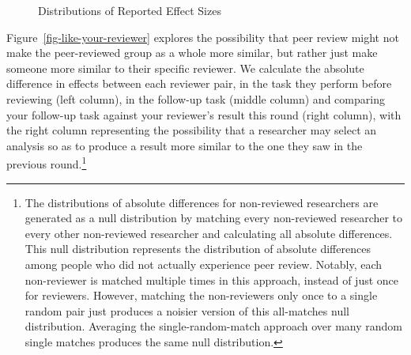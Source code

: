 \documentclass[
  letterpaper,
  DIV=11,
  numbers=noendperiod]{scrartcl}
\begin{document}
\begin{figure}


\caption{\label{fig-peer-review-effect-distributions}Distributions of
Reported Effect Sizes}

\end{figure}%

Figure~\ref{fig-like-your-reviewer} explores the possibility that peer
review might not make the peer-reviewed group as a whole more similar,
but rather just make someone more similar to their specific reviewer. We
calculate the absolute difference in effects between each reviewer pair,
in the task they perform before reviewing (left column), in the
follow-up task (middle column) and comparing your follow-up task against
your reviewer's result this round (right column), with the right column
representing the possibility that a researcher may select an analysis so
as to produce a result more similar to the one they saw in the previous
round.\footnote{The distributions of absolute differences for
  non-reviewed researchers are generated as a null distribution by
  matching every non-reviewed researcher to every other non-reviewed
  researcher and calculating all absolute differences. This null
  distribution represents the distribution of absolute differences among
  people who did not actually experience peer review. Notably, each
  non-reviewer is matched multiple times in this approach, instead of
  just once for reviewers. However, matching the non-reviewers only once
  to a single random pair just produces a noisier version of this
  all-matches null distribution. Averaging the single-random-match
  approach over many random single matches produces the same null
  distribution.}
\end{document}
